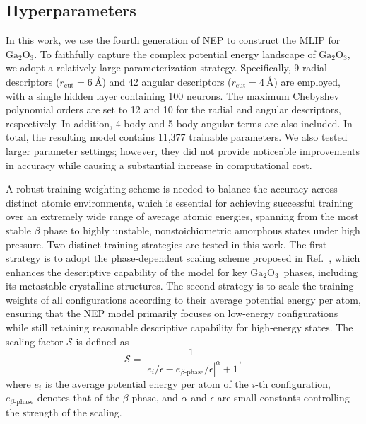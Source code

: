 \documentclass[aip,graphicx,amsmath,amssymb]{revtex4-1}
\newcommand{\ga}{$\text{Ga}_2\text{O}_3$}
\begin{document}
\subsection{Hyperparameters}

In this work, we use the fourth generation of NEP\cite{song_general-purpose_2024} to construct 
the MLIP for \ga. To faithfully capture the complex potential energy landscape of \ga, 
we adopt a relatively large parameterization strategy. 
Specifically, 9 radial descriptors ($r_\text{cut}=6~\text{\AA}$) and 
42 angular descriptors ($r_\text{cut}=4~\text{\AA}$) are employed, 
with a single hidden layer containing 100 neurons. 
The maximum Chebyshev polynomial orders are set to 12 and 10 for the radial and angular 
descriptors, respectively. 
In addition, 4-body and 5-body angular terms are also included.\cite{fan_gpumd_2022} 
In total, the resulting model contains 11,377 trainable parameters. 
We also tested larger parameter settings; however, they did not provide noticeable improvements 
in accuracy while causing a substantial increase in computational cost.

A robust training-weighting scheme is needed to balance the accuracy across distinct atomic 
environments, which is essential for achieving successful training over an extremely wide range 
of average atomic energies, spanning from the most stable $\beta$ phase to highly unstable, nonstoichiometric 
amorphous states under high pressure. 
Two distinct training strategies are tested in this work. 
The first strategy is to adopt the phase-dependent scaling scheme proposed in Ref.~, 
which enhances the descriptive capability of the model for key \ga\ phases, including its 
metastable crystalline structures. 
The second strategy is to scale the training weights of all configurations according to their 
average potential energy per atom, ensuring that the NEP model primarily focuses on low-energy 
configurations while still retaining reasonable descriptive capability for high-energy states.
The scaling factor $\mathcal{S}$ is defined as
\begin{equation}
\label{eq:scaling}
\mathcal{S} = \frac{1}{\left|e_i/\epsilon - e_{\beta\text{-phase}}/\epsilon\right|^{\alpha} + 1},
\end{equation}
where $e_i$ is the average potential energy per atom of the $i$-th configuration, 
$e_{\beta\text{-phase}}$ denotes that of the $\beta$ phase, 
and $\alpha$ and $\epsilon$ are small constants controlling the strength of the scaling.
\end{document}
